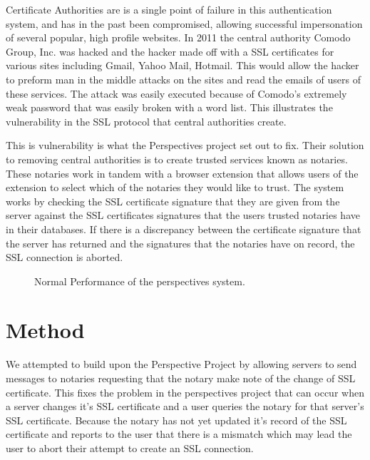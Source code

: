 \documentclass[preprint,review,12pt]{elsarticle}
\begin{document}
Certificate Authorities are is a single point of failure in this authentication
system, and has in the past been compromised, allowing successful impersonation
of several popular, high profile websites.  In 2011 the central authority
Comodo Group, Inc. was hacked and the hacker made off with a SSL certificates
for various sites including Gmail, Yahoo Mail, Hotmail.  \citep{comodohack}
This would allow the hacker to preform man in the middle attacks on the sites
and read the emails of users of these services. The attack was easily executed
because of Comodo's extremely weak password that was easily broken with a word
list. This illustrates the vulnerability in the SSL protocol that central
authorities create.

This is vulnerability is what the Perspectives project set out to fix. Their
solution to removing central authorities is to create trusted services known as
notaries. These notaries work in tandem with a browser extension that allows
users of the extension to select which of the notaries they would like to
trust. The system works by checking the SSL certificate signature that they are
given from the server against the SSL certificates signatures that the users
trusted notaries have in their databases. If there is a discrepancy between the
certificate signature that the server has returned and the signatures that the
notaries have on record, the SSL connection is aborted.

\begin{figure}[h]
\caption{Normal Performance of the perspectives system.}
\end{figure}

\section{Method}
\label{Method}

We attempted to build upon the Perspective Project by allowing
servers to send messages to notaries requesting that the notary make note of
the change of SSL certificate. This fixes the problem in the perspectives
project that can occur when a server changes it's SSL certificate and a user
queries the notary for that server's SSL certificate. Because the notary has
not yet updated it's record of the SSL certificate and reports to the user that
there is a mismatch which may lead the user to abort their attempt to create an
SSL connection.
\end{document}
